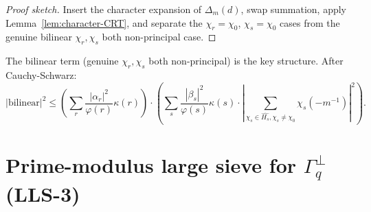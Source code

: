 \documentclass[11pt]{article}
\begin{document}
\begin{proof}[Proof sketch]
Insert the character expansion of $\Delta_m(d)$, swap summation, apply Lemma~\ref{lem:character-CRT}, and separate the $\chi_r = \chi_0$, $\chi_s = \chi_0$ cases from the genuine bilinear $\chi_r, \chi_s$ both non-principal case.
\end{proof}

The bilinear term (genuine $\chi_r, \chi_s$ both non-principal) is the key structure. After Cauchy-Schwarz:
\[
|\text{bilinear}|^2 \leq \left( \sum_r \frac{|\alpha_r|^2}{\varphi(r)} \kappa(r) \right) \cdot \left( \sum_s \frac{|\beta_s|^2}{\varphi(s)} \kappa(s) \cdot \left| \sum_{\chi_s \in \widehat{H_s}, \chi_s \neq \chi_0} \chi_s(-m^{-1}) \right|^2 \right).
\]

\section{Prime-modulus large sieve for $\Gamma_q^\perp$ (LLS-3)}
\end{document}
